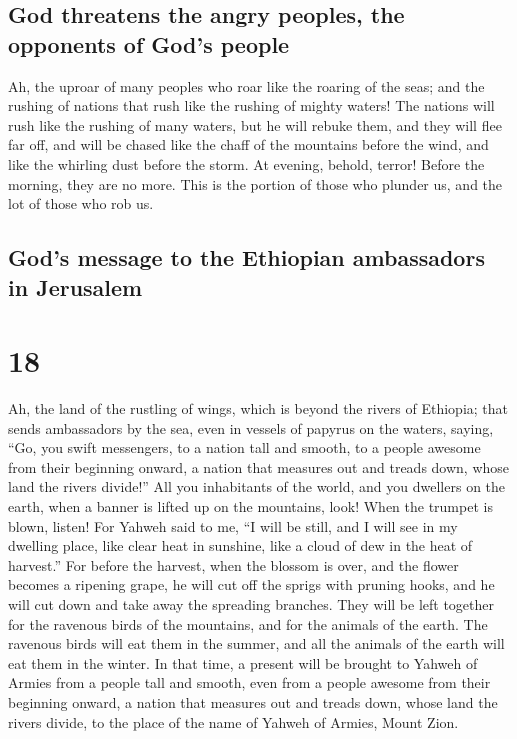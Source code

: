 \hypertarget{god-threatens-the-angry-peoples-the-opponents-of-gods-people}{%
\subsection{God threatens the angry peoples, the opponents of God's
people}\label{god-threatens-the-angry-peoples-the-opponents-of-gods-people}}

 Ah, the uproar of many peoples who roar like the roaring
of the seas; and the rushing of nations that rush like the rushing of
mighty waters!  The nations will rush like the rushing of
many waters, but he will rebuke them, and they will flee far off, and
will be chased like the chaff of the mountains before the wind, and like
the whirling dust before the storm.  At evening, behold,
terror! Before the morning, they are no more. This is the portion of
those who plunder us, and the lot of those who rob us.

\hypertarget{gods-message-to-the-ethiopian-ambassadors-in-jerusalem}{%
\subsection{God's message to the Ethiopian ambassadors in
Jerusalem}\label{gods-message-to-the-ethiopian-ambassadors-in-jerusalem}}

\hypertarget{section-17}{%
\section{18}\label{section-17}}

 Ah, the land of the rustling of wings, which is beyond
the rivers of Ethiopia;  that sends ambassadors by the
sea, even in vessels of papyrus on the waters, saying, ``Go, you swift
messengers, to a nation tall and smooth, to a people awesome from their
beginning onward, a nation that measures out and treads down, whose land
the rivers divide!''  All you inhabitants of the world,
and you dwellers on the earth, when a banner is lifted up on the
mountains, look! When the trumpet is blown, listen!  For
Yahweh said to me, ``I will be still, and I will see in my dwelling
place, like clear heat in sunshine, like a cloud of dew in the heat of
harvest.''  For before the harvest, when the blossom is
over, and the flower becomes a ripening grape, he will cut off the
sprigs with pruning hooks, and he will cut down and take away the
spreading branches.  They will be left together for the
ravenous birds of the mountains, and for the animals of the earth. The
ravenous birds will eat them in the summer, and all the animals of the
earth will eat them in the winter.  In that time, a
present will be brought to Yahweh of Armies from a people tall and
smooth, even from a people awesome from their beginning onward, a nation
that measures out and treads down, whose land the rivers divide, to the
place of the name of Yahweh of Armies, Mount Zion.

